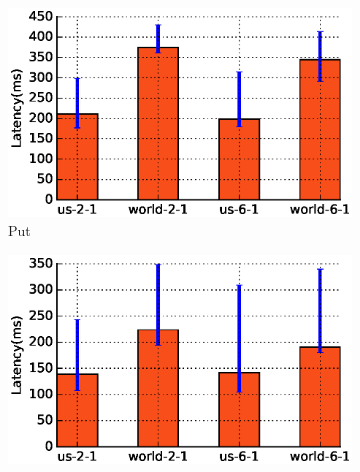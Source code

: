 
\begin{figure}[t]
    \begin{subfigure}{0.45\textwidth}
      \includegraphics[width=\linewidth]{plots/giza_four_put}

      \caption{Put}
      \label{fig:geo_tpcc_throughput}
    \end{subfigure}
%
    \begin{subfigure}{0.45\textwidth}
      \includegraphics[width=\linewidth]{plots/giza_four_get}


\end{subfigure}
\end{figure}
